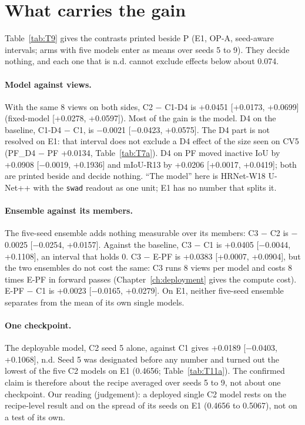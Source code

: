 \section{What carries the gain}\label{sec:e1-parts}

Table~\ref{tab:T9} gives the contrasts printed beside P (E1, OP-A, seed-aware intervals; arms with five models enter as means
over seeds 5 to 9). They decide nothing, and each one that is n.d. cannot exclude effects below about 0.074.

\paragraph{Model against views.} With the same 8 views on both sides, C2 $-$ C1-D4 is +0.0451 [+0.0173, +0.0699] (fixed-model
[+0.0278, +0.0597]). Most of the gain is the model. D4 on the baseline, C1-D4 $-$ C1, is $-$0.0021 [$-$0.0423, +0.0575]. The D4
part is not resolved on E1: that interval does not exclude a D4 effect of the size seen on CV5 (PF\_D4 $-$ PF +0.0134,
Table~\ref{tab:T7a}). D4 on PF moved inactive IoU by +0.0908 [$-$0.0019, +0.1936] and mIoU-R13 by +0.0206 [+0.0017, +0.0419];
both are printed beside and decide nothing. ``The model'' here is HRNet-W18 U-Net++ with the \texttt{swad} readout as one unit;
E1 has no number that splits it.

\paragraph{Ensemble against its members.} The five-seed ensemble adds nothing measurable over its members: C3 $-$ C2 is
$-$0.0025 [$-$0.0254, +0.0157]. Against the baseline, C3 $-$ C1 is +0.0405 [$-$0.0044, +0.1108], an interval that holds 0. C3
$-$ E-PF is +0.0383 [+0.0007, +0.0904], but the two ensembles do not cost the same: C3 runs 8 views per model and costs 8 times
E-PF in forward passes (Chapter~\ref{ch:deployment} gives the compute cost). E-PF $-$ C1 is +0.0023 [$-$0.0165, +0.0279]. On E1,
neither five-seed ensemble separates from the mean of its own single models.

\paragraph{One checkpoint.} The deployable model, C2 seed 5 alone, against C1 gives +0.0189 [$-$0.0403, +0.1068], n.d. Seed 5
was designated before any number and turned out the lowest of the five C2 models on E1 (0.4656; Table~\ref{tab:T11a}). The
confirmed claim is therefore about the recipe averaged over seeds 5 to 9, not about one checkpoint. Our reading (judgement): a
deployed single C2 model rests on the recipe-level result and on the spread of its seeds on E1 (0.4656 to 0.5067), not on a
test of its own.

